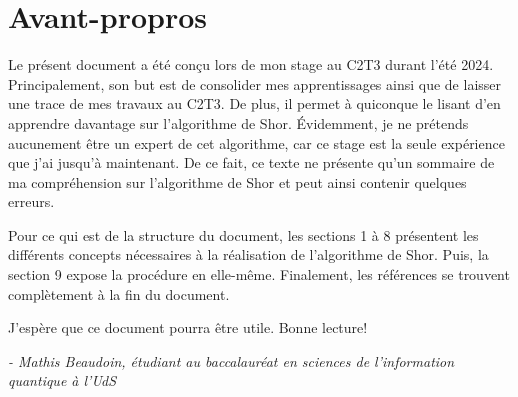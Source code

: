 \section*{Avant-propros}
Le présent document a été conçu lors de mon stage au C2T3 durant l'été 2024. Principalement, son but est de consolider mes apprentissages ainsi que de laisser une trace de mes travaux au C2T3. De plus, il permet à quiconque le lisant d'en apprendre davantage sur l'algorithme de Shor.
Évidemment, je ne prétends aucunement être un expert de cet algorithme, car ce stage est la seule expérience que j'ai jusqu'à maintenant. De ce fait, ce texte ne présente qu'un sommaire de ma compréhension sur l'algorithme de Shor et peut ainsi contenir quelques erreurs.

Pour ce qui est de la structure du document, les sections 1 à 8 présentent les différents concepts nécessaires à la réalisation de l'algorithme de Shor. Puis, la section 9 expose la procédure en elle-même. Finalement, les références se trouvent complètement à la fin du document.

J'espère que ce document pourra être utile. Bonne lecture!

\textit{- Mathis Beaudoin, étudiant au baccalauréat en sciences de l'information quantique à l'UdS}